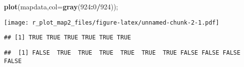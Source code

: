 \documentclass[]{article}
\newenvironment{Shaded}{\begin{snugshade}}{\end{snugshade}}
\newcommand{\KeywordTok}[1]{\textcolor[rgb]{0.13,0.29,0.53}{\textbf{#1}}}
\newcommand{\DataTypeTok}[1]{\textcolor[rgb]{0.13,0.29,0.53}{#1}}
\newcommand{\DecValTok}[1]{\textcolor[rgb]{0.00,0.00,0.81}{#1}}
\newcommand{\StringTok}[1]{\textcolor[rgb]{0.31,0.60,0.02}{#1}}
\newcommand{\CommentTok}[1]{\textcolor[rgb]{0.56,0.35,0.01}{\textit{#1}}}
\newcommand{\OperatorTok}[1]{\textcolor[rgb]{0.81,0.36,0.00}{\textbf{#1}}}
\newcommand{\NormalTok}[1]{#1}
\begin{document}
\begin{Shaded}
\begin{Highlighting}[]
\KeywordTok{plot}\NormalTok{(mapdata,}\DataTypeTok{col=}\KeywordTok{gray}\NormalTok{(}\DecValTok{924}\OperatorTok{:}\DecValTok{0}\OperatorTok{/}\DecValTok{924}\NormalTok{));}
\end{Highlighting}
\end{Shaded}

\texttt{[image: r\_plot\_map2\_files/figure-latex/unnamed-chunk-2-1.pdf]}

\begin{Shaded}
\end{Shaded}

\begin{Shaded}
\end{Shaded}

\begin{verbatim}
## [1] TRUE TRUE TRUE TRUE TRUE TRUE
\end{verbatim}

\begin{Shaded}
\end{Shaded}

\begin{verbatim}
##  [1] FALSE  TRUE  TRUE  TRUE  TRUE  TRUE  TRUE FALSE FALSE FALSE FALSE
\end{verbatim}

\begin{Shaded}
\end{Shaded}
\end{document}
